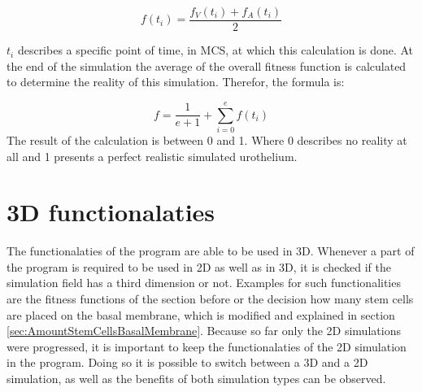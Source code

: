\begin{equation} 
f(t_{i}) = \dfrac{f_{V}(t_{i})+f_{A}(t_{i})}{2}
\end{equation}

$t_{i}$ describes a specific point of time, in \ac{MCS}, at which this calculation is done. At the end of the simulation the average of the overall fitness function is calculated to determine the reality of this simulation. Therefor, the formula is:

\begin{equation} 
f = \dfrac{1}{e+1} + \sum_{i=0}^{e}{f(t_{i})}
\end{equation}
The result of the calculation is between 0 and 1. Where 0 describes no reality at all and 1 presents a perfect realistic simulated urothelium.


\section{3D functionalaties}\label{sec:3D}
The functionalaties of the program are able to be used in 3D. Whenever a part of the program is required to be used in 2D as well as in 3D, it is checked if the simulation field has a third dimension or not. Examples for such functionalities are the fitness functions of the section before or the decision how many stem cells are placed on the basal membrane, which is modified and explained in section \ref{sec:AmountStemCellsBasalMembrane}. \newline
Because so far only the 2D simulations were progressed, it is important to keep the functionalaties of the 2D simulation in the program. Doing so it is possible to switch between a 3D and a 2D simulation, as well as the benefits of both simulation types can be observed.
